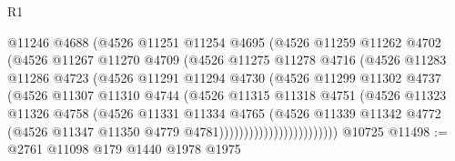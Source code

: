 \begin{lexlean}{R1}
\begin{coremodule}
                          @11246
                          @4688
                          (@4526
                            @11251
                            @11254
                            @4695
                            (@4526
                              @11259
                              @11262
                              @4702
                              (@4526
                                @11267
                                @11270
                                @4709
                                (@4526
                                  @11275
                                  @11278
                                  @4716
                                  (@4526
                                    @11283
                                    @11286
                                    @4723
                                    (@4526
                                      @11291
                                      @11294
                                      @4730
                                      (@4526
                                        @11299
                                        @11302
                                        @4737
                                        (@4526
                                          @11307
                                          @11310
                                          @4744
                                          (@4526
                                            @11315
                                            @11318
                                            @4751
                                            (@4526
                                              @11323
                                              @11326
                                              @4758
                                              (@4526
                                                @11331
                                                @11334
                                                @4765
                                                (@4526
                                                  @11339
                                                  @11342
                                                  @4772
                                                  (@4526
                                                    @11347
                                                    @11350
                                                    @4779
                                                    @4781))))))))))))))))))))))))
    @10725
@11498 := @2761 @11098 @179 @1440 @1978 @1975

\end{coremodule}
\end{lexlean}

